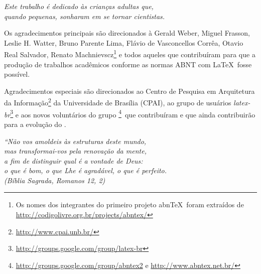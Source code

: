 \documentclass[
	12pt,				%
	openright,			%
	twoside,			%
	a4paper,			%
	english,			%
	french,				%
	spanish,			%
	brazil				%
	]{abntex2}
\begin{document}
\begin{dedicatoria}
   \vspace*{\fill}
   \centering
   \noindent
   \textit{ Este trabalho é dedicado às crianças adultas que,\\
   quando pequenas, sonharam em se tornar cientistas.} \vspace*{\fill}
\end{dedicatoria}

\begin{agradecimentos}
Os agradecimentos principais são direcionados à Gerald Weber, Miguel Frasson,
Leslie H. Watter, Bruno Parente Lima, Flávio de Vasconcellos Corrêa, Otavio Real
Salvador, Renato Machnievscz\footnote{Os nomes dos integrantes do primeiro
projeto abn\TeX\ foram extraídos de
\url{http://codigolivre.org.br/projects/abntex/}} e todos aqueles que
contribuíram para que a produção de trabalhos acadêmicos conforme
as normas ABNT com \LaTeX\ fosse possível.

Agradecimentos especiais são direcionados ao Centro de Pesquisa em Arquitetura
da Informação\footnote{\url{http://www.cpai.unb.br/}} da Universidade de
Brasília (CPAI), ao grupo de usuários
\emph{latex-br}\footnote{\url{http://groups.google.com/group/latex-br}} e aos
novos voluntários do grupo
\emph{\abnTeX}\footnote{\url{http://groups.google.com/group/abntex2} e
\url{http://www.abntex.net.br/}}~que contribuíram e que ainda
contribuirão para a evolução do \abnTeX.

\end{agradecimentos}

\begin{epigrafe}
    \vspace*{\fill}
	\begin{flushright}
		\textit{``Não vos amoldeis às estruturas deste mundo, \\
		mas transformai-vos pela renovação da mente, \\
		a fim de distinguir qual é a vontade de Deus: \\
		o que é bom, o que Lhe é agradável, o que é perfeito.\\
		(Bíblia Sagrada, Romanos 12, 2)}
	\end{flushright}
\end{epigrafe}

\end{document}
